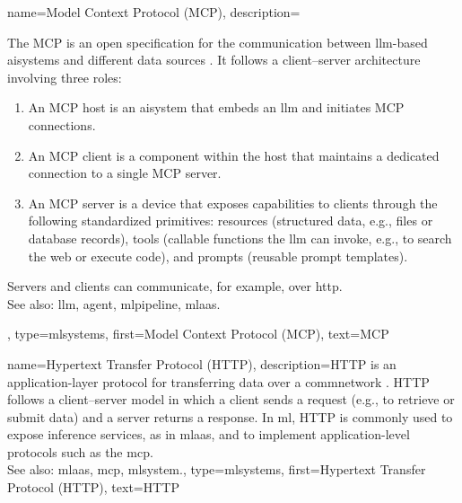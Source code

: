 {name={Model Context Protocol (MCP)},
	description={The MCP
		is an open specification for the communication between \gls{llm}-based
		\glspl{aisystem} and different \gls{data} sources \cite{MCPSpec2025}.
		It follows a client--server architecture involving three roles: 
		\begin{enumerate}[label=\arabic*)]
			\item An MCP host is an \gls{aisystem} that embeds an \gls{llm} and 
			initiates MCP connections.
			\item An MCP client is a component within the host that maintains
			a dedicated connection to a single MCP server.
			\item An MCP server is a \gls{device} that exposes capabilities
			to clients through the following standardized primitives:
			resources (structured \gls{data}, e.g., files or database records),
			tools (callable functions the \gls{llm} can invoke, e.g.,
			to search the web or execute code), and prompts (reusable prompt templates).
		\end{enumerate}
		Servers and clients can communicate, for example, over \gls{http}.
		\\
		See also: \gls{llm}, \gls{agent}, \gls{mlpipeline}, \gls{mlaas}.},
	type=mlsystems,
	first={Model Context Protocol (MCP)},
	text={MCP}
}

{name={Hypertext Transfer Protocol (HTTP)},
	description={HTTP is an application-layer\linebreak 
		protocol for transferring \gls{data} over a \gls{commnetwork} \cite{Coulouris2012}.
		HTTP follows a client--server model in which a client sends a request
		(e.g., to retrieve or submit \gls{data}) and a server returns a response.
		In \gls{ml}, HTTP is commonly used to expose \gls{inference} services,
		as in \gls{mlaas}, and to implement application-level protocols such as the \gls{mcp}.
		\\
		See also: \gls{mlaas}, \gls{mcp}, \gls{mlsystem}.},
	type=mlsystems,
	first={Hypertext Transfer Protocol (HTTP)},
	text={HTTP}
}

